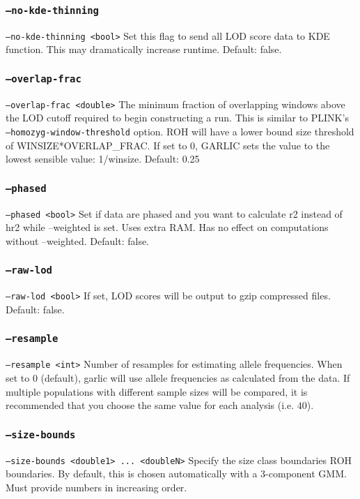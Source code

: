 \documentclass[12pt]{article}%
\begin{document}
\subsubsection{{\tt --no-kde-thinning}}
{\tt --no-kde-thinning <bool>} Set this flag to send all LOD score data to KDE function. This may dramatically increase runtime. Default: false.

\subsubsection{{\tt --overlap-frac}}
{\tt --overlap-frac <double>} The minimum fraction of overlapping windows above the LOD cutoff required to begin constructing a run. This is similar to PLINK's {\tt --homozyg-window-threshold} option. ROH will have a lower bound size threshold of WINSIZE*OVERLAP\_FRAC. If set to 0, GARLIC sets the value to the lowest sensible value: 1/winsize. Default: 0.25

\subsubsection{{\tt --phased}}
{\tt --phased <bool>} Set if data are phased and you want to calculate r2 instead of hr2 while --weighted is set.
Uses extra RAM. Has no effect on computations without --weighted. Default: false.

\subsubsection{{\tt --raw-lod}}
{\tt --raw-lod <bool>} If set, LOD scores will be output to gzip compressed files. Default: false.

\subsubsection{{\tt --resample}}
{\tt --resample <int>} Number of resamples for estimating allele frequencies. When set to $0$ (default), garlic will use allele frequencies as calculated from the data. If multiple populations with different sample sizes will be compared, it is recommended that you choose the same value for each analysis (i.e. $40$).

\subsubsection{{\tt --size-bounds}}
{\tt --size-bounds <double1> ... <doubleN>} Specify the size class boundaries ROH boundaries. By default, this is chosen automatically with a 3-component GMM.  Must provide numbers in increasing order.
\end{document}
